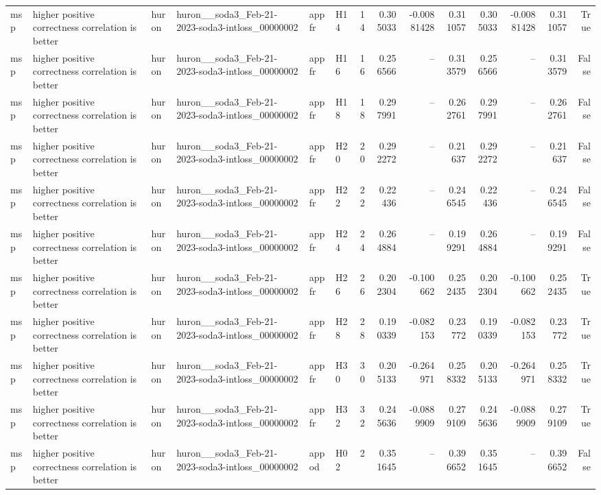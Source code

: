 \begin{longtable}{llllllrrrrrrrr}
msp & higher positive correctness correlation is better & huron & huron\_\_soda3\_Feb-21-2023-soda3-intloss\_00000002 & appfr & H14 & 14 & 0.305033 & -0.00881428 & 0.311057 & 0.305033 & -0.00881428 & 0.311057 & True \\
msp & higher positive correctness correlation is better & huron & huron\_\_soda3\_Feb-21-2023-soda3-intloss\_00000002 & appfr & H16 & 16 & 0.256566 & -- & 0.313579 & 0.256566 & -- & 0.313579 & False \\
msp & higher positive correctness correlation is better & huron & huron\_\_soda3\_Feb-21-2023-soda3-intloss\_00000002 & appfr & H18 & 18 & 0.297991 & -- & 0.262761 & 0.297991 & -- & 0.262761 & False \\
msp & higher positive correctness correlation is better & huron & huron\_\_soda3\_Feb-21-2023-soda3-intloss\_00000002 & appfr & H20 & 20 & 0.292272 & -- & 0.21637 & 0.292272 & -- & 0.21637 & False \\
msp & higher positive correctness correlation is better & huron & huron\_\_soda3\_Feb-21-2023-soda3-intloss\_00000002 & appfr & H22 & 22 & 0.22436 & -- & 0.246545 & 0.22436 & -- & 0.246545 & False \\
msp & higher positive correctness correlation is better & huron & huron\_\_soda3\_Feb-21-2023-soda3-intloss\_00000002 & appfr & H24 & 24 & 0.264884 & -- & 0.199291 & 0.264884 & -- & 0.199291 & False \\
msp & higher positive correctness correlation is better & huron & huron\_\_soda3\_Feb-21-2023-soda3-intloss\_00000002 & appfr & H26 & 26 & 0.202304 & -0.100662 & 0.252435 & 0.202304 & -0.100662 & 0.252435 & True \\
msp & higher positive correctness correlation is better & huron & huron\_\_soda3\_Feb-21-2023-soda3-intloss\_00000002 & appfr & H28 & 28 & 0.190339 & -0.082153 & 0.23772 & 0.190339 & -0.082153 & 0.23772 & True \\
msp & higher positive correctness correlation is better & huron & huron\_\_soda3\_Feb-21-2023-soda3-intloss\_00000002 & appfr & H30 & 30 & 0.205133 & -0.264971 & 0.258332 & 0.205133 & -0.264971 & 0.258332 & True \\
msp & higher positive correctness correlation is better & huron & huron\_\_soda3\_Feb-21-2023-soda3-intloss\_00000002 & appfr & H32 & 32 & 0.245636 & -0.0889909 & 0.279109 & 0.245636 & -0.0889909 & 0.279109 & True \\
msp & higher positive correctness correlation is better & huron & huron\_\_soda3\_Feb-21-2023-soda3-intloss\_00000002 & appod & H02 & 2 & 0.351645 & -- & 0.396652 & 0.351645 & -- & 0.396652 & False \\

\end{longtable}
